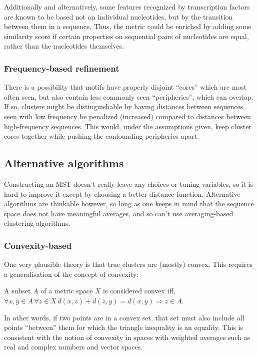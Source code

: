 \documentclass[fleqn]{book}
\begin{document}
Additionally and alternatively, some features recognized by
transcription factors are known to be based not on individual
nucleotides, but by the transition between them in a sequence. Thus, the
metric could be enriched by adding some similarity score if certain
properties on sequential pairs of nucleotides are equal, rather than the
nucleotides themselves.

\subsubsection{Frequency-based
refinement}\label{frequency-based-refinement}

There is a possibility that motifs have properly disjoint ``cores''
which are most often seen, but also contain less commonly seen
``peripheries'', which can overlap. If so, clusters might be
distinguishable by having distances between sequences seen with low
frequency be penalized (increased) compared to distances between
high-frequency sequences. This would, under the assumptions given, keep
cluster cores together while pushing the confounding peripheries apart.

\subsection{Alternative algorithms}\label{alternative-algorithms}

Constructing an MST doesn't really leave any choices or tuning
variables, so it is hard to improve it except by choosing a better
distance function. Alternative algorithms are thinkable however, so long
as one keeps in mind that the sequence space does not have meaningful
averages, and so can't use averaging-based clustering algorithms.

\subsubsection{Convexity-based}\label{convexity-based}

One very plausible theory is that true clusters are (mostly) convex.
This requires a generalisation of the concept of convexity:

A subset \(A\) of a metric space \(X\) is considered convex iff,
\(∀ x, y ∈ A \, ∀ z ∈ X \, d(x,z) + d(z,y) = d(x,y) ⇒ z ∈ A\).

In other words, if two points are in a convex set, that set must also
include all points ``between'' them for which the triangle inequality is
an equality. This is consistent with the notion of convexity in spaces
with weighted averages such as real and complex numbers and vector
spaces.
\end{document}
